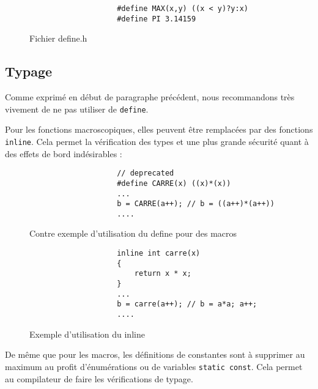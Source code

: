 			\begin{figure}[H]
				\begin{changemargin}{-2.5cm}{-2.5cm}
				\begin{tcolorbox}
				\begin{verbatim}
					#define MAX(x,y) ((x < y)?y:x)
					#define PI 3.14159
				\end{verbatim}
				\end{tcolorbox}
				\end{changemargin}
				\caption{Fichier define.h}
			\end{figure}

		\subsection{Typage}
			Comme exprimé en début de paragraphe précédent, nous recommandons très vivement de ne pas utiliser de \verb+define+.

			Pour les fonctions macroscopiques, elles peuvent être remplacées par des fonctions \verb+inline+. Cela permet la vérification des types et une plus grande sécurité quant à des effets de bord indésirables :

			\begin{figure}[H]
				\begin{changemargin}{-2.5cm}{-2.5cm}
				\begin{tcolorbox}
				\begin{verbatim}
					// deprecated
					#define CARRE(x) ((x)*(x))
					...
					b = CARRE(a++); // b = ((a++)*(a++))
					....
				\end{verbatim}
				\end{tcolorbox}
				\end{changemargin}
				\caption{Contre exemple d'utilisation du define pour des macros}
				

				\begin{changemargin}{-2.5cm}{-2.5cm}
				\begin{tcolorbox}
				\begin{verbatim}
					inline int carre(x)
					{
					    return x * x;
					}
					...
					b = carre(a++); // b = a*a; a++;
					....
				\end{verbatim}
				\end{tcolorbox}
				\end{changemargin}
				\caption{Exemple d'utilisation du inline}
			\end{figure}

			De même que pour les macros, les définitions de constantes sont à supprimer au maximum au profit d’énumérations ou de variables \verb+static const+. Cela permet au compilateur de faire les vérifications de typage.

